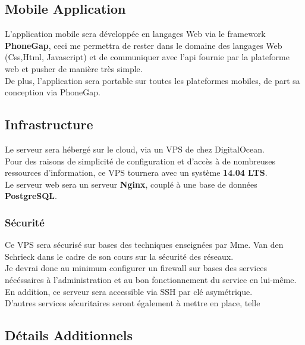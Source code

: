 \documentclass{report}
\begin{document}
	\subsection{Mobile Application}

		L'application mobile sera développée en langages Web via le framework \textbf{PhoneGap}, ceci me permettra de rester dans le domaine des langages Web (Css,Html, Javascript) et de communiquer avec l'api fournie par la plateforme web et pusher de manière très simple.\\

		De plus, l'application sera portable sur toutes les plateformes mobiles, de part sa conception via PhoneGap.\\

	\subsection{Infrastructure}

		Le serveur sera hébergé sur le cloud, via un VPS de chez DigitalOcean.\\

		Pour des raisons de simplicité de configuration et d'accès à de nombreuses ressources d'information, ce VPS tournera avec un système \textbf{14.04 LTS}.\\

		Le serveur web sera un serveur \textbf{Nginx}, couplé à une base de données \textbf{PostgreSQL}.\\

		\subsubsection{Sécurité}
		
			Ce VPS sera sécurisé sur bases des techniques enseignées par Mme. Van den Schrieck dans le cadre de son cours sur la sécurité des réseaux.\\

			Je devrai donc au minimum configurer un firewall sur bases des services nécéssaires à l'administration et au bon fonctionnement du service en lui-même.\\
			En addition, ce serveur sera accessible via SSH par clé asymétrique.\\
			D'autres services sécuritaires seront également à mettre en place, telle

	\subsection{Détails Additionnels}
\end{document}

